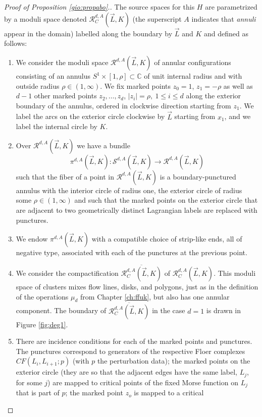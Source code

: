 \begin{proof}[Proof of Proposition \ref{gio:propabo}.]
The source spaces for this $H$ are parametrized by a moduli space denoted $\mathcal{R}_C^{d,A}(\vec{L},K)$ (the superscript $A$ indicates that \textit{annuli} appear in the domain) labelled along the boundary by $\vec{L}$ and $K$ and defined as follows:
\begin{enumerate}
	\item We consider the moduli space $\mathcal{R}^{d,A}(\vec{L},K)$ of annular configurations
consisting of an annulus $S^{1}\times [1,\rho]\subset \mathbb{C}$ of unit internal radius and with outside radius $\rho\in (1,\infty)$.  We fix marked points  $z_0=1$, $z_1=-\rho$ as well as $d-1$ other marked points  $z_2,\ldots, z_d$, $|z_{i}|=\rho,\ 1\leq i \leq d$ along the exterior boundary of the annulus, ordered in clockwise direction starting from $z_{1}$.  We  label  the arcs on the exterior circle clockwise by $\vec{L}$ starting from $x_{1}$, and we label the internal circle by $K$.
	\item Over $\mathcal{R}^{d,A}(\vec{L},K)$ we have a bundle $$\pi^{d,A}(\vec{L},K)\colon \mathcal{S}^{d,A}(\vec{L},K)\to \mathcal{R}^{d,A}(\vec{L},K)$$ such that the fiber of a point in
	$\mathcal{R}^{d,A}(\vec{L},K)$  is a boundary-punctured annulus with the interior circle of radius one, the exterior circle of radius some $\rho\in (1,\infty)$ and such that the marked points on the exterior circle that are adjacent to two geometrically distinct Lagrangian labels are replaced with punctures.
	\item We endow $\pi^{d,A}(\vec{L},K)$ with a compatible choice of strip-like ends, all of negative type, associated with each of the punctures at the previous point.
	\item We consider the compactification $\overline{\mathcal{R}_C^{d,A}(\vec{L},K)}$ of $\mathcal{R}_C^{d,A}(\vec{L},K)$. This moduli space of clusters mixes flow lines, disks, and polygons, just as in the definition of the operations $\mu_{d}$ from Chapter \ref{ch:ffuk}, but also has one annular component.  The boundary of $\overline{\mathcal{R}^{d,A}_C(\vec{L},K)}$ in the case $d=1$ is drawn in Figure \ref{fig:deg1}.
	\item There are incidence conditions for each of the marked points and punctures. The punctures correspond to generators of the respective Floer complexes $CF(L_{i},L_{i+1};p)$ (with $p$ the perturbation data); the marked points on the exterior circle (they are so that the adjacent edges have the same label, $L_{j}$, for some $j$) are mapped to critical points of the fixed Morse
	function on $L_{j}$ that is part of $p$; the marked point $z_{o}$ is mapped to a critical

\end{enumerate}
\end{proof}
